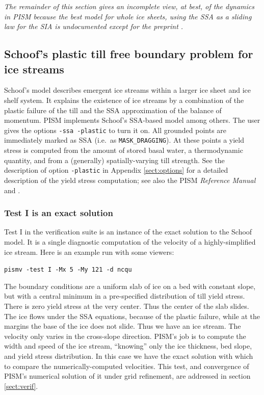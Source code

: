 \documentclass[11pt,final]{amsart}
\newcommand{\pismoptionindex}[1]{\index{options for PISM (and PETSc)!\texttt{-#1}}}
\newcommand{\intextoption}[1]{\texttt{-#1}\pismoptionindex{#1}}
\begin{document}
\emph{The remainder of this section gives an incomplete view, at best, of the dynamics in PISM because the best model for whole ice sheets, using the SSA as a sliding law for the SIA is undocumented except for the preprint \cite{BBssasliding}.}


\subsection{Schoof's plastic till free boundary problem for ice streams} \label{subsect:plastic}    Schoof's model \cite{SchoofStream} describes emergent ice streams within a larger ice sheet and ice shelf system.  It explains the existence of ice streams by a combination of the plastic failure of the till and the SSA approximation of the balance of momentum.  PISM implements Schoof's SSA-based model among others.  The user gives the options \verb|-ssa -plastic| to turn it on.  All grounded points are immediately marked as SSA (i.e.~as \verb|MASK_DRAGGING|).  At these points a yield stress is computed from the amount of stored basal water, a thermodynamic quantity, and from a (generally) spatially-varying till strength.  See the description of option \intextoption{plastic} in Appendix \ref{sect:options} for a detailed description of the yield stress computation; see also the PISM \emph{Reference Manual} and \cite{BBssasliding}.

\subsubsection*{Test I is an exact solution}  Test I in the verification suite is an instance of the exact solution to the Schoof model.  It is a single diagnostic computation of the velocity of a highly-simplified ice stream.  Here is an example run with some viewers:

\verb|pismv -test I -Mx 5 -My 121 -d ncqu|

\noindent The boundary conditions are a uniform slab of ice on a bed with constant slope, but with a central minimum in a pre-specified distribution of till yield stress.  There is zero yield stress at the very center.  Thus the center of the slab slides.  The ice flows under the SSA equations, because of the plastic failure, while at the margins the base of the ice does not slide.  Thus we have an ice stream.  The velocity only varies in the cross-slope direction.  PISM's job is to compute the width and speed of the ice stream, ``knowing'' only the ice thickness, bed slope, and yield stress distribution.  In this case we have the exact solution with which to compare the numerically-computed velocities.  This test, and convergence of PISM's numerical solution of it under grid refinement, are addressed in section \ref{sect:verif}.
\end{document}
